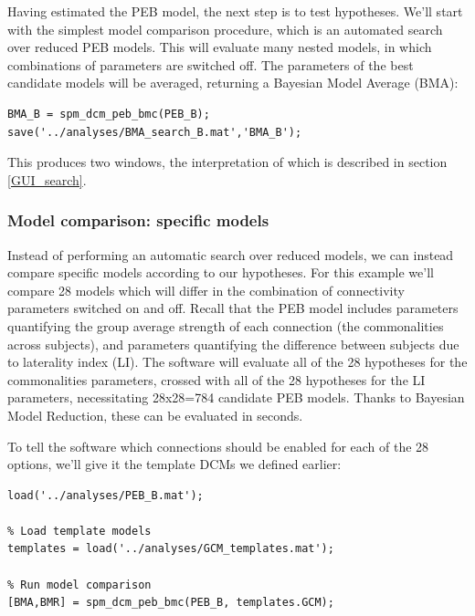 \documentclass{article}
\begin{document}
Having estimated the PEB model, the next step is to test hypotheses. We'll start with the simplest model comparison procedure, which is an automated search over reduced PEB models. This will evaluate many nested models, in which combinations of parameters are switched off. The parameters of the best candidate models will be averaged, returning a Bayesian Model Average (BMA):

\begin{lstlisting}[style=Matlab-editor,caption=Automatic PEB search]
BMA_B = spm_dcm_peb_bmc(PEB_B);
save('../analyses/BMA_search_B.mat','BMA_B');          
\end{lstlisting}

This produces two windows, the interpretation of which is described in section \ref{GUI_search}.

\subsubsection{Model comparison: specific models}
Instead of performing an automatic search over reduced models, we can instead compare specific models according to our hypotheses. For this example we'll compare 28 models which will differ in the combination of connectivity parameters switched on and off. Recall that the PEB model includes parameters quantifying the group average strength of each connection (the commonalities across subjects), and parameters quantifying the difference between subjects due to laterality index (LI). The software will evaluate all of the 28 hypotheses for the commonalities parameters, crossed with all of the 28 hypotheses for the LI parameters, necessitating 28x28=784 candidate PEB models. Thanks to Bayesian Model Reduction, these can be evaluated in seconds.

To tell the software which connections should be enabled for each of the 28 options, we'll give it the template DCMs we defined earlier:

\begin{lstlisting}[style=Matlab-editor,caption=Compare specific PEB models]
% Load estimated PEB
load('../analyses/PEB_B.mat');

% Load template models
templates = load('../analyses/GCM_templates.mat');

% Run model comparison
[BMA,BMR] = spm_dcm_peb_bmc(PEB_B, templates.GCM);
\end{lstlisting}
\end{document}
